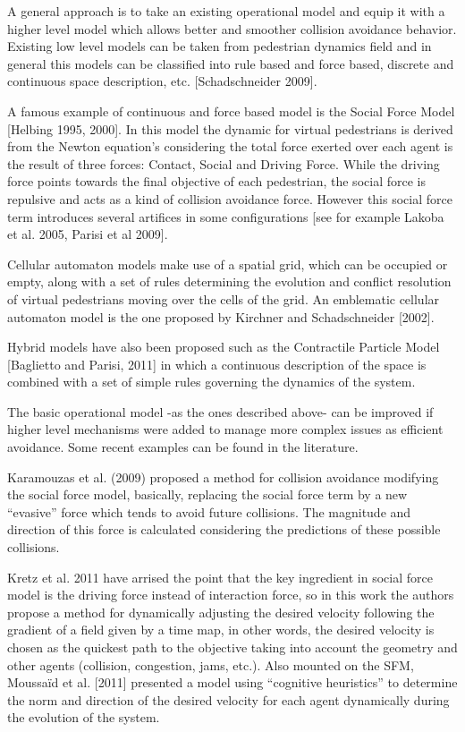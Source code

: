 \documentclass[english]{article}
\numberwithin{equation}{section}
\numberwithin{figure}{section}
\begin{document}
A general approach is to take an existing operational model and equip
it with a higher level model which allows better and smoother collision
avoidance behavior. Existing low level models can be taken from pedestrian
dynamics field and in general this models can be classified into rule
based and force based, discrete and continuous space description,
etc. {[}Schadschneider 2009{]}.

A famous example of continuous and force based model is the Social
Force Model {[}Helbing 1995, 2000{]}. In this model the dynamic for
virtual pedestrians is derived from the Newton equation\textquoteright s
considering the total force exerted over each agent is the result
of three forces: Contact, Social and Driving Force. While the driving
force points towards the final objective of each pedestrian, the social
force is repulsive and acts as a kind of collision avoidance force.
However this social force term introduces several artifices in some
configurations {[}see for example Lakoba et al. 2005, Parisi et al
2009{]}.

Cellular automaton models make use of a spatial grid, which can be
occupied or empty, along with a set of rules determining the evolution
and conflict resolution of virtual pedestrians moving over the cells
of the grid. An emblematic cellular automaton model is the one proposed
by Kirchner and Schadschneider {[}2002{]}.

Hybrid models have also been proposed such as the Contractile Particle
Model {[}Baglietto and Parisi, 2011{]} in which a continuous description
of the space is combined with a set of simple rules governing the dynamics
of the system.

The basic operational model -as the ones described above- can be improved
if higher level mechanisms were added to manage more complex issues
as efficient avoidance. Some recent examples can be found in the literature.

Karamouzas et al. (2009) proposed a method for collision avoidance
modifying the social force model, basically, replacing the social
force term by a new \textquotedblleft evasive\textquotedblright{}
force which tends to avoid future collisions. The magnitude and direction
of this force is calculated considering the predictions of these possible
collisions.

Kretz et al. 2011 have arrised the point that the key ingredient in
social force model is the driving force instead of interaction force,
so in this work the authors propose a method for dynamically adjusting
the desired velocity following the gradient of a field given by a
time map, in other words, the desired velocity is chosen as the quickest
path to the objective taking into account the geometry and other agents
(collision, congestion, jams, etc.). Also mounted on the SFM, Moussaïd
et al. {[}2011{]} presented a model using \textquotedblleft cognitive
heuristics\textquotedblright{} to determine the norm and direction
of the desired velocity for each agent dynamically during the evolution
of the system. 
\end{document}
